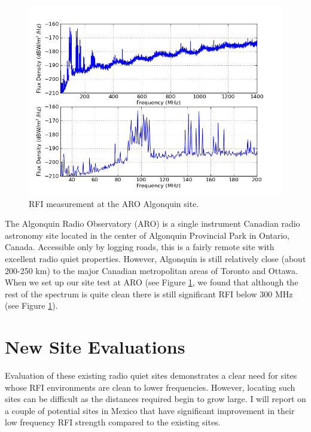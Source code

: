 \begin{figure}[htb]
\begin{center}
\includegraphics[width=0.95\linewidth]{RFI_testing/figures/ALG_cal.png}
\caption{RFI measurement at the ARO Algonquin site.}
\label{Fig:arorfi}
\end{center}
\end{figure}

The Algonquin Radio Observatory (ARO) is a single instrument Canadian radio astronomy site located in the center of Algonquin Provincial Park in Ontario, Canada. Accessible only by logging roads, this is a fairly remote site with excellent radio quiet properties. However, Algonquin is still relatively close (about 200-250 km) to the major Canadian metropolitan areas of Toronto and Ottawa. When we set up our site test at ARO (see Figure \ref{Fig:arorfi}, we found that although the rest of the spectrum is quite clean there is still significant RFI below 300 MHz (see Figure \ref{Fig:arorfi}). 

\section{New Site Evaluations}
Evaluation of these existing radio quiet sites demonstrates a clear need for sites whose RFI environments are clean to lower frequencies. However, locating such sites can be difficult as the distances required begin to grow large. I will report on a couple of potential sites in Mexico that have significant improvement in their low frequency RFI strength compared to the existing sites. 

